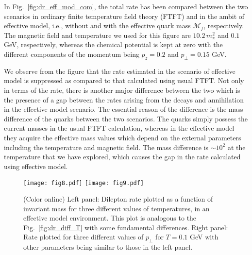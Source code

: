 \documentclass[aps,prd,floatfix,showpacs,showkeys,superscriptadress,unsortedaddress,nofootinbib,onecolumn]{revtex4-1}
\newcommand{\sperp}{\scriptscriptstyle{\perp}}
\begin{document}
In Fig.~\ref{fig:dr_eff_mod_com}, the total rate has been compared between the two scenarios \textemdash in ordinary finite temperature field theory (FTFT) and in the ambit of effective model, i.e., without and with the effective quark mass $\mathcal{M}_f$, respectively. The magnetic field and temperature we used for this figure are $10.2\,m_\pi^2$ and $0.1$ GeV, respectively, whereas the chemical potential is kept at zero with the different components of the momentum being $p_z=0.2$ and $p_{\sperp}=0.15$ GeV.

We observe from the figure that the rate estimated in the scenario of effective model is suppressed as compared to that calculated using usual FTFT. Not only in terms of the rate, there is another major difference between the two which is the presence of a gap between the rates arising from the decays and annihilation in the effective model scenario. The essential reason of the difference is the mass difference of the quarks between the two scenarios. The quarks simply possess the current masses in the usual FTFT calculation, whereas in the effective model they acquire the effective mass values which depend on the external parameters including the temperature and magnetic field. The mass difference is $\sim 10^2$ at the temperature that we have explored, which causes the gap in the rate calculated using effective model. 
\begin{figure}
\begin{center}
\texttt{[image: fig8.pdf]}
\texttt{[image: fig9.pdf]}
\caption{(Color online) Left panel: Dilepton rate plotted as a function of invariant mass for three different values of temperatures, in an effective model environment. This plot is analogous to the Fig.~\ref{fig:dr_diff_T} with some fundamental differences. Right panel: Rate plotted for three different values of $p_{\sperp}$ for $T=0.1$ GeV with other parameters being similar to those in the left panel.}
\label{fig:dr_diff_T_eff_mod}
\end{center}
\end{figure}
\end{document}
